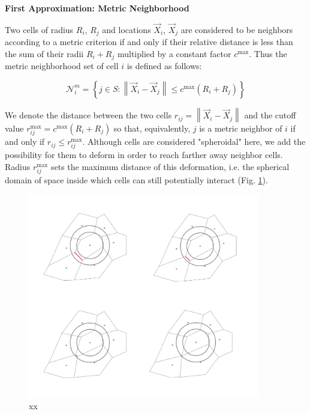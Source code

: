 \textbf{First Approximation: Metric Neighborhood}

Two cells of radius $R_i$, $R_j$ and locations $\vec{X}_i$, $\vec{X}_j$ are considered to be neighbors according to a metric criterion if and only if their relative distance is less than the sum of their radii $R_i + R_j$ multiplied by a constant factor $c^{\mathrm{max}}$. Thus the metric neighborhood set of cell $i$ is defined as follows:

$$\mathcal{N}^m_i = \left \{  j \in S : \left\|\vec{X}_i - \vec{X}_j\right\| \leq c^{\mathrm{max}} (R_i+R_j) \right \} $$

We denote the distance between the two cells $r_{ij} = \left\|\vec{X}_i - \vec{X}_j\right\|$ and the cutoff value $r^{\mathrm{max}}_{ij} = c^{\mathrm{max}}(R_i+R_j)$ so that, equivalently, $j$ is a metric neighbor of $i$ if and only if $r_{ij} \leq r^{\mathrm{max}}_{ij}$. Although cells are considered "spheroidal" here, we add the possibility for them to deform in order to reach farther away neighbor cells. Radius $r^{\mathrm{max}}_{ij}$ sets the maximum distance of this deformation, i.e. the spherical domain of space inside which cells can still potentially interact (Fig. \ref{spatial_neighb_surface_distance_why_all_figure}).
\begin{figure}
\begin{center}
\includegraphics[width=0.9\textwidth]{../../images/MECAGEN/spatial_neighb/surface_distance_why_all_figure.png}
\end{center}
\caption{xx}
\label{spatial_neighb_surface_distance_why_all_figure}
\end{figure}


